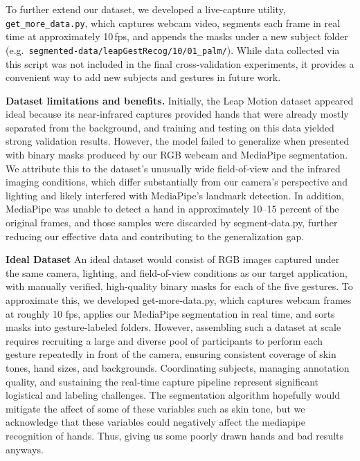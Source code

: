 \documentclass{article}
\begin{document}
To further extend our dataset, we developed a live‑capture utility, \texttt{get\_more\_data.py}, which captures webcam video, segments each frame in real time at approximately 10\,fps, and appends the masks under a new subject folder (e.g.\ \texttt{segmented-data/leapGestRecog/10/01\_palm/}).  While data collected via this script was not included in the final cross‑validation experiments, it provides a convenient way to add new subjects and gestures in future work.

\medskip
\noindent\textbf{Dataset limitations and benefits.} Initially, the Leap Motion dataset appeared ideal because its near‑infrared captures provided hands that were already mostly separated from the background, and training and testing on this data yielded strong validation results. However, the model failed to generalize when presented with binary masks produced by our RGB webcam and MediaPipe segmentation. We attribute this to the dataset’s unusually wide field‑of‑view and the infrared imaging conditions, which differ substantially from our camera’s perspective and lighting and likely interfered with MediaPipe’s landmark detection. In addition, MediaPipe was unable to detect a hand in approximately 10–15 percent of the original frames, and those samples were discarded by segment‑data.py, further reducing our effective data and contributing to the generalization gap.

\medskip
\noindent\textbf{Ideal Dataset} An ideal dataset would consist of RGB images captured under the same camera, lighting, and field-of-view conditions as our target application, with manually verified, high-quality binary masks for each of the five gestures. To approximate this, we developed get‑more‑data.py, which captures webcam frames at roughly 10 fps, applies our MediaPipe segmentation in real time, and sorts masks into gesture-labeled folders. However, assembling such a dataset at scale requires recruiting a large and diverse pool of participants to perform each gesture repeatedly in front of the camera, ensuring consistent coverage of skin tones, hand sizes, and backgrounds. Coordinating subjects, managing annotation quality, and sustaining the real‑time capture pipeline represent significant logistical and labeling challenges. The segmentation algorithm hopefully would mitigate the affect of some of these variables such as skin tone, but we acknowledge that these variables could negatively affect the mediapipe recognition of hands. Thus, giving us some poorly drawn hands and bad results anyways.
\end{document}
